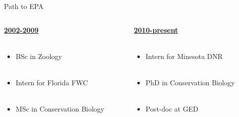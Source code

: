 \documentclass[serif]{beamer}\usepackage[]{graphicx}\usepackage[]{color}
\begin{document}
\begin{frame}{Path to EPA}
\begin{columns}[t]
\begin{column}{0.35\textwidth}
\underline{\textbf{2002-2009}}\\~\\
\begin{itemize}
\item BSc in Zoology \\~\\
\item Intern for Florida FWC \\~\\
\item MSc in Conservation Biology \\~\\
\end{itemize}
\end{column}
\begin{column}{0.35\textwidth}
\underline{\textbf{2010-present}}\\~\\
\begin{itemize}
\item Intern for Minesota DNR \\~\\
\item PhD in Conservation Biology \\~\\
\item Post-doc at GED \\~\\
\end{itemize}
\end{column}
\end{columns}
\end{frame}
\end{document}
